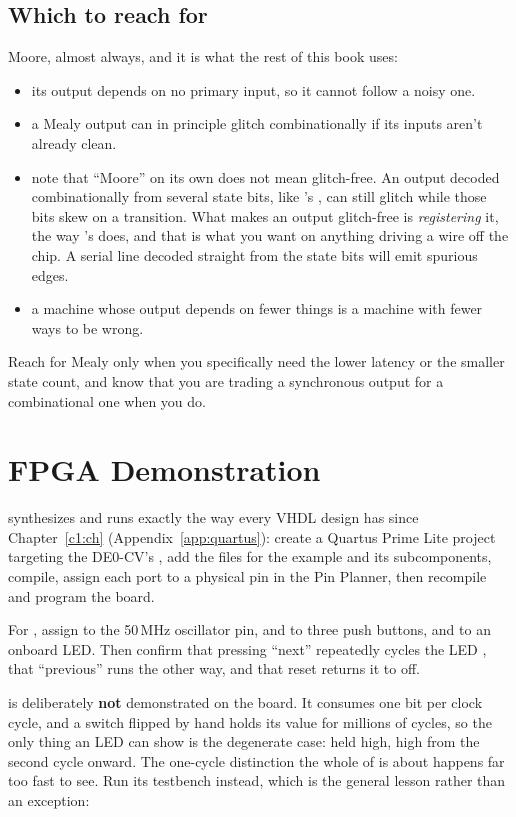 \subsection{Which to reach for}
\label{c8:whichone}
Moore, almost always, and it is what the rest of this book uses:
\begin{itemize}
  \item its output depends on no primary input, so it cannot follow a noisy one.
  \item a Mealy output can in principle glitch combinationally if its inputs aren't already clean.
  \item note that ``Moore'' on its own does not mean glitch-free. An output decoded combinationally
    from several state bits, like 's , can still glitch while those
    bits skew on a transition. What makes an output glitch-free is \emph{registering} it, the way
    's  does, and that is what you want on anything driving a wire
    off the chip. A serial  line decoded straight from the state bits will emit spurious
    edges.
  \item a machine whose output depends on fewer things is a machine with fewer ways to be wrong.
\end{itemize}
Reach for Mealy only when you specifically need the lower latency or the smaller state count, and
know that you are trading a synchronous output for a combinational one when you do.

\section{FPGA Demonstration}
\label{c8:a6}
 synthesizes and runs exactly the way every VHDL design has since
Chapter~\ref{c1:ch} (Appendix~\ref{app:quartus}): create a Quartus Prime Lite project targeting the
DE0-CV's , add the  files for the example and its subcomponents,
compile, assign each port to a physical pin in the Pin Planner, then recompile and program the
board.

For , assign  to the 50\,MHz oscillator pin,  and
 to three push buttons, and  to an onboard LED. Then confirm
that pressing ``next'' repeatedly cycles the LED , that
``previous'' runs the other way, and that reset returns it to off.

 is deliberately \textbf{not} demonstrated on the board. It consumes one bit
per clock cycle, and a switch flipped by hand holds its value for millions of cycles, so the only
thing an LED can show is the degenerate case:  held high,  high from the second
cycle onward. The one-cycle distinction the whole of  is about happens far too fast
to see. Run its testbench instead, which is the general lesson rather than an exception:

